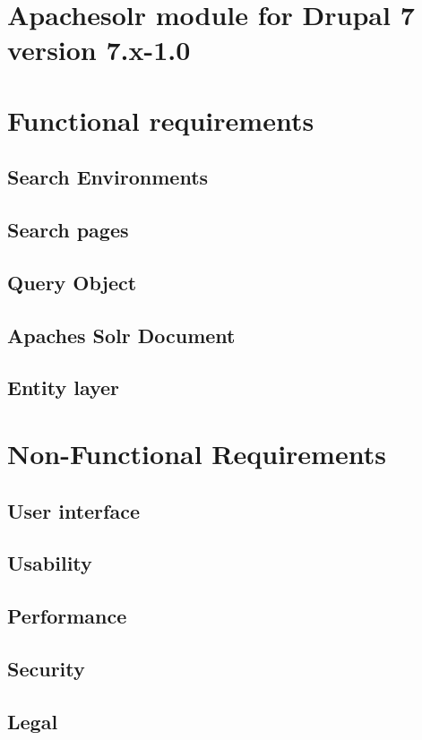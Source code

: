 \section{Apachesolr module for Drupal 7 version 7.x-1.0}
\section{Functional requirements}
\subsection{Search Environments}
\subsection{Search pages}
\subsection{Query Object}
\subsection{Apaches Solr Document}
\subsection{Entity layer}
\section{Non-Functional Requirements}
\subsection{User interface}
\subsection{Usability}
\subsection{Performance}
\subsection{Security}
\subsection{Legal}